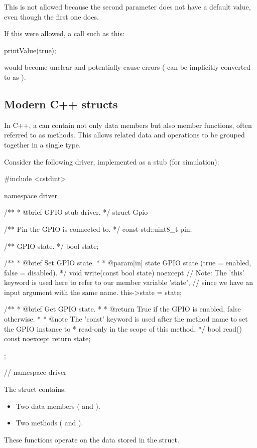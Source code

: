 \noindent This is not allowed because the second parameter does not have a default value, even
though the first one does.

If this were allowed, a call such as this:

\begin{cppcode}
printValue(true);
\end{cppcode}

\noindent would become unclear and potentially cause errors ( can be implicitly
converted to  as ).

\subsection{Modern C++ structs}
\label{c1:sec:structs}
In C++, a  can contain not only data members but also member functions, often
referred to as methods. This allows related data and operations to be grouped together in a
single type.

Consider the following  driver, implemented as a stub (for simulation):

\begin{cppcode}
#include <cstdint>

namespace driver
{
/**
 * @brief GPIO stub driver.
 */
struct Gpio
{
    /** Pin the GPIO is connected to. */
    const std::uint8_t pin;

    /** GPIO state. */
    bool state;

    /**
     * @brief Set GPIO state.
     *
     * @param[in] state GPIO state (true = enabled, false = disabled).
     */
    void write(const bool state) noexcept
    {
        // Note: The 'this' keyword is used here to refer to our member variable 'state',
        // since we have an input argument with the same name.
        this->state = state;
    }

    /**
     * @brief Get GPIO state.
     *
     * @return True if the GPIO is enabled, false otherwise.
     *
     * @note The 'const' keyword is used after the method name to set the GPIO instance to
     *       read-only in the scope of this method.
     */
    bool read() const noexcept { return state; }
};
} // namespace driver
\end{cppcode}

\noindent The  struct contains:
\begin{itemize}
  \item Two data members ( and ).
  \item Two methods ( and ).
\end{itemize}
These functions operate on the data stored in the struct.

